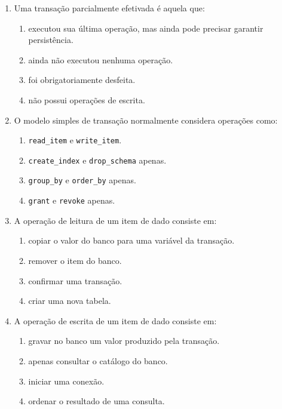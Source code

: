 \documentclass[12pt,a4paper]{article}
\begin{document}
\begin{enumerate}[label=\textbf{Q\arabic*.}]
\item Uma transação parcialmente efetivada é aquela que:

\begin{enumerate}[label=\alph*)]
    \item executou sua última operação, mas ainda pode precisar garantir persistência.
    \item ainda não executou nenhuma operação.
    \item foi obrigatoriamente desfeita.
    \item não possui operações de escrita.
\end{enumerate}

\item O modelo simples de transação normalmente considera operações como:

\begin{enumerate}[label=\alph*)]
    \item \texttt{read\_item} e \texttt{write\_item}.
    \item \texttt{create\_index} e \texttt{drop\_schema} apenas.
    \item \texttt{group\_by} e \texttt{order\_by} apenas.
    \item \texttt{grant} e \texttt{revoke} apenas.
\end{enumerate}

\item A operação de leitura de um item de dado consiste em:

\begin{enumerate}[label=\alph*)]
    \item copiar o valor do banco para uma variável da transação.
    \item remover o item do banco.
    \item confirmar uma transação.
    \item criar uma nova tabela.
\end{enumerate}

\item A operação de escrita de um item de dado consiste em:

\begin{enumerate}[label=\alph*)]
    \item gravar no banco um valor produzido pela transação.
    \item apenas consultar o catálogo do banco.
    \item iniciar uma conexão.
    \item ordenar o resultado de uma consulta.
\end{enumerate}


\end{enumerate}
\end{document}
